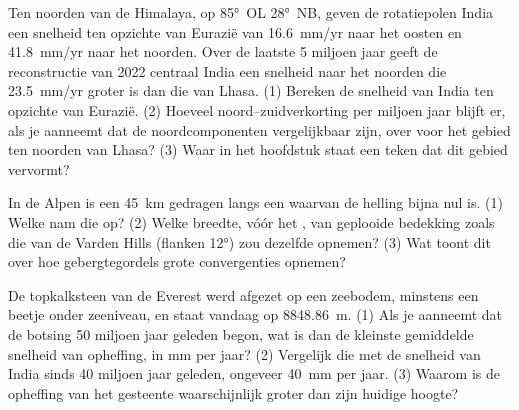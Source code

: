\begin{exercise}[$\star\star\star$]\label{exo:g12:mountain-building:13}
Ten noorden van de Himalaya, op \ang{85}~OL \ang{28}~NB, geven de rotatiepolen India
een snelheid ten opzichte van Eurazië van \qty{16.6}{mm/yr} naar het oosten en
\qty{41.8}{mm/yr} naar het noorden. Over de laatste 5 miljoen jaar geeft de reconstructie van
2022 centraal India een snelheid naar het noorden die \qty{23.5}{mm/yr}
groter is dan die van Lhasa. (1) Bereken de snelheid van India ten opzichte van
Eurazië. (2) Hoeveel noord--zuidverkorting per miljoen jaar blijft er, als je aanneemt dat de noordcomponenten vergelijkbaar zijn,
over voor het gebied ten noorden van
Lhasa? (3) Waar in het hoofdstuk staat een teken dat dit gebied vervormt?
\end{exercise}

\begin{exercise}[$\star\star\star$]\label{exo:g12:mountain-building:14}
In de Alpen is een  \qty{45}{km} gedragen langs een  waarvan de helling
bijna nul is. (1) Welke  nam die  op? (2) Welke breedte,
vóór het , van geplooide bedekking zoals die van de Varden Hills (flanken
\ang{12}) zou dezelfde  opnemen? (3) Wat toont dit over
hoe gebergtegordels grote convergenties opnemen?
\end{exercise}

\begin{exercise}[$\star\star\star$]\label{exo:g12:mountain-building:15}
De topkalksteen van de Everest werd afgezet op een zeebodem, minstens een
beetje onder zeeniveau, en staat vandaag op \qty{8848.86}{m}. (1) Als je
aanneemt dat de botsing 50 miljoen jaar geleden begon, wat is dan de kleinste gemiddelde
snelheid van opheffing, in \unit{mm} per jaar? (2) Vergelijk die met de snelheid van India sinds
40 miljoen jaar geleden, ongeveer \qty{40}{mm} per jaar. (3) Waarom is de opheffing van
het gesteente waarschijnlijk groter dan zijn huidige hoogte?
\end{exercise}

